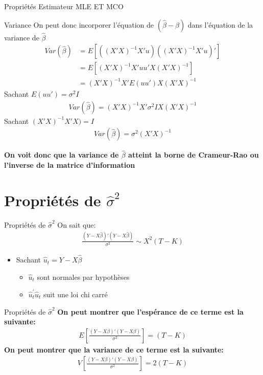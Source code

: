 \documentclass{beamer}
\begin{document}
\begin{frame}{Propriétés Estimateur MLE ET MCO}
\begin{block}{Variance}
On peut donc incorporer l'équation de $(\hat{\beta}-\beta)$ dans l'équation de la variance de $\hat{\beta}$
\begin{align*}
Var(\hat{\beta})&=E[((X'X)^{-1}X'u)((X'X)^{-1}X'u)'] \\ & = E[(X'X)^{-1}X'uu'X(X'X)^{-1}] \\ & = (X'X)^{-1}X'E(uu')X(X'X)^{-1}
\end{align*}
Sachant $E(uu')=\sigma^2I$
\begin{align*}
Var(\hat{\beta})=(X'X)^{-1}X'\sigma^2IX(X'X)^{-1}
\end{align*}
Sachant $(X'X)^{-1}X'X)=I$
\begin{align*}
Var(\hat{\beta})=\sigma^2(X'X)^{-1}
\end{align*}
\end{block}
\textbf{On voit donc que la variance de $\hat{\beta}$ atteint la borne de Crameur-Rao ou l'inverse de la matrice d'information}
\end{frame}

\section{Propriétés de $\hat{\sigma}^2$}

\frame{\tableofcontents[current]}


\begin{frame}{Propriétés de $\hat{\sigma}^2$}
On sait que:
\begin{align*}
\frac{(Y-X \hat{\beta})'(Y-X \hat{\beta})}{\sigma^2} \sim X^2(T-K)
\end{align*}
\begin{itemize}
\item Sachant $\hat{u}_t=Y-X \hat{\beta}$
\begin{itemize}
\item $\hat{u}_t$ sont normales par hypothèses
\item $\hat{u}_t^{'}\hat{u}_t$ suit une loi chi carré
\end{itemize}
\end{itemize}
\end{frame}

\begin{frame}{Propriétés de $\hat{\sigma}^2$}
\textbf{On peut montrer que l'espérance de ce terme est la suivante:}
\begin{align*}
E \left[ \frac{(Y-X \beta)'(Y-X \beta)}{\sigma^2}\right]=(T-K)
\end{align*}
\textbf{On peut montrer que la variance de ce terme est la suivante:}
\begin{align*}
V \left[ \frac{(Y-X \beta)'(Y-X \beta)}{\sigma^2}\right]=2(T-K)
\end{align*}
\end{frame}
\end{document}

